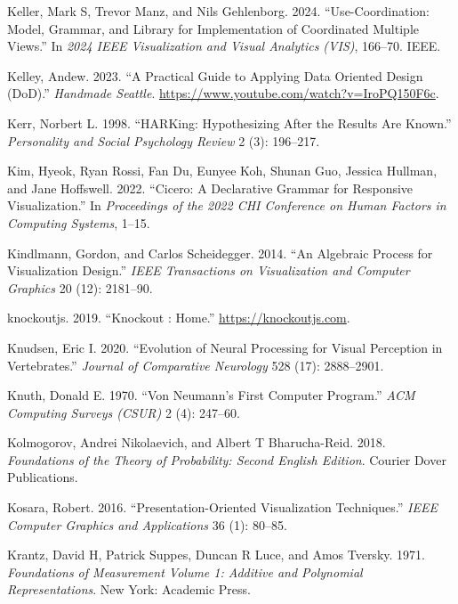 \documentclass[
  openany]{book}
\newlength{\cslhangindent}
\newenvironment{CSLReferences}[2] %
 {\begin{list}{}{%
  \setlength{\itemindent}{0pt}
  \setlength{\leftmargin}{0pt}
  \setlength{\parsep}{0pt}
  \ifodd #1
   \setlength{\leftmargin}{\cslhangindent}
   \setlength{\itemindent}{-1\cslhangindent}
  \fi
  \setlength{\itemsep}{#2\baselineskip}}}
 {\end{list}}
\theoremstyle{definition}
\theoremstyle{definition}
\theoremstyle{definition}
\theoremstyle{definition}
\theoremstyle{remark}
\begin{document}
\begin{CSLReferences}{1}{0}
Keller, Mark S, Trevor Manz, and Nils Gehlenborg. 2024. {``Use-Coordination: Model, Grammar, and Library for Implementation of Coordinated Multiple Views.''} In \emph{2024 IEEE Visualization and Visual Analytics (VIS)}, 166--70. IEEE.

Kelley, Andew. 2023. {``A Practical Guide to Applying Data Oriented Design (DoD).''} \emph{Handmade Seattle}. \url{https://www.youtube.com/watch?v=IroPQ150F6c}.

Kerr, Norbert L. 1998. {``HARKing: Hypothesizing After the Results Are Known.''} \emph{Personality and Social Psychology Review} 2 (3): 196--217.

Kim, Hyeok, Ryan Rossi, Fan Du, Eunyee Koh, Shunan Guo, Jessica Hullman, and Jane Hoffswell. 2022. {``Cicero: A Declarative Grammar for Responsive Visualization.''} In \emph{Proceedings of the 2022 CHI Conference on Human Factors in Computing Systems}, 1--15.

Kindlmann, Gordon, and Carlos Scheidegger. 2014. {``An Algebraic Process for Visualization Design.''} \emph{IEEE Transactions on Visualization and Computer Graphics} 20 (12): 2181--90.

knockoutjs. 2019. {``{Knockout : Home}.''} \url{https://knockoutjs.com}.

Knudsen, Eric I. 2020. {``Evolution of Neural Processing for Visual Perception in Vertebrates.''} \emph{Journal of Comparative Neurology} 528 (17): 2888--2901.

Knuth, Donald E. 1970. {``Von Neumann's First Computer Program.''} \emph{ACM Computing Surveys (CSUR)} 2 (4): 247--60.

Kolmogorov, Andrei Nikolaevich, and Albert T Bharucha-Reid. 2018. \emph{Foundations of the Theory of Probability: Second English Edition}. Courier Dover Publications.

Kosara, Robert. 2016. {``Presentation-Oriented Visualization Techniques.''} \emph{IEEE Computer Graphics and Applications} 36 (1): 80--85.

Krantz, David H, Patrick Suppes, Duncan R Luce, and Amos Tversky. 1971. \emph{Foundations of Measurement Volume 1: Additive and Polynomial Representations}. New York: Academic Press.


\end{CSLReferences}
\end{document}
